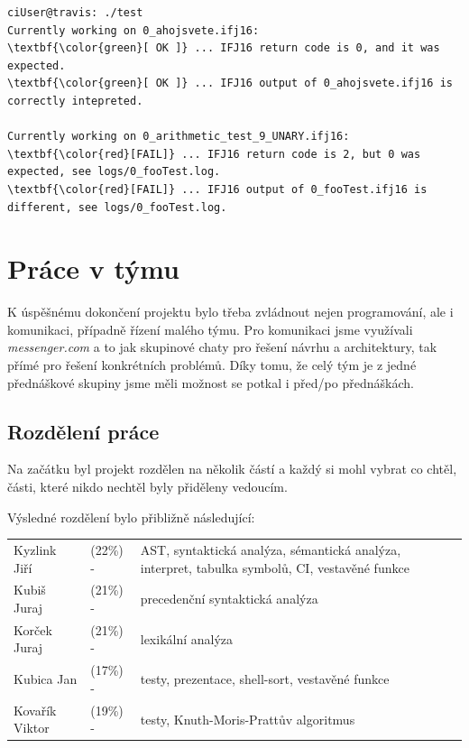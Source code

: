 \documentclass[a4paper,11pt]{article}
\begin{document}

\begin{Verbatim}
ciUser@travis: ./test
Currently working on 0_ahojsvete.ifj16:
\textbf{\color{green}[ OK ]} ... IFJ16 return code is 0, and it was expected.
\textbf{\color{green}[ OK ]} ... IFJ16 output of 0_ahojsvete.ifj16 is correctly intepreted.

Currently working on 0_arithmetic_test_9_UNARY.ifj16:
\textbf{\color{red}[FAIL]} ... IFJ16 return code is 2, but 0 was expected, see logs/0_fooTest.log.
\textbf{\color{red}[FAIL]} ... IFJ16 output of 0_fooTest.ifj16 is different, see logs/0_fooTest.log.
\end{Verbatim}

\section{Práce v týmu}
K úspěšnému dokončení projektu bylo třeba zvládnout nejen programování, ale i komunikaci, případně řízení malého týmu. Pro komunikaci jsme využívali \emph{messenger.com} a to jak skupinové chaty pro řešení návrhu a architektury, tak přímé pro řešení konkrétních problémů. Díky tomu, že celý tým je z jedné přednáškové skupiny jsme měli možnost se potkal i před/po přednáškách.

\subsection{Rozdělení práce}
Na začátku byl projekt rozdělen na několik částí a každý si mohl vybrat co chtěl, části, které nikdo nechtěl byly přiděleny vedoucím.

Výsledné rozdělení bylo přibližně následující:\medskip

\begin{tabular}{llp{11.9cm}}
	Kyzlink Jiří &(22\%) \space - & AST, syntaktická analýza, sémantická analýza, interpret, tabulka symbolů, CI, vestavěné funkce \\
	Kubiš Juraj	&(21\%) \space - & precedenční syntaktická analýza \\
	Korček Juraj &(21\%) \space - & lexikální analýza \\
	Kubica Jan &(17\%) \space - & testy, prezentace, shell-sort, vestavěné funkce \\
	Kovařík Viktor &(19\%) \space - & testy, Knuth-Moris-Prattův algoritmus  \\
\end{tabular}
\medskip
\end{document}
